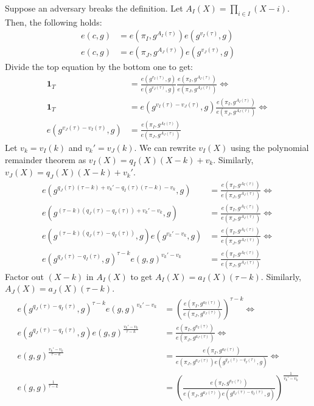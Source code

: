 Suppose an adversary breaks the definition.
Let $A_I(X)= \prod_{i\in I} (X - i)$.
Then, the following holds:
\begin{align}
e(c,g) &= e(\pi_I, g^{A_I(\tau)}) e(g^{v_I(\tau)},g)\\
e(c,g) &= e(\pi_J, g^{A_J(\tau)}) e(g^{v_J(\tau)},g)
\end{align}
Divide the top equation by the bottom one to get:
\begin{align}
\mathbf{1}_T &= \frac{e(g^{v_I(\tau)},g)}{e(g^{v_J(\tau)},g)} \frac{e(\pi_I, g^{A_I(\tau)})}{e(\pi_J, g^{A_J(\tau)})}\Leftrightarrow\\
\mathbf{1}_T &= e(g^{v_I(\tau)-v_J(\tau)},g) \frac{e(\pi_I, g^{A_I(\tau)})}{e(\pi_J, g^{A_J(\tau)})}\Leftrightarrow\\
e(g^{v_J(\tau)-v_I(\tau)},g) &= \frac{e(\pi_I, g^{A_I(\tau)})}{e(\pi_J, g^{A_J(\tau)})}
\end{align}
Let $v_k = v_I(k)$ and $v_k' = v_J(k)$.
We can rewrite $v_I(X)$ using the polynomial remainder theorem as $v_I(X)=q_I(X)(X-k) + v_k$.
Similarly, $v_J(X)=q_J(X)(X-k) + v_k'$.
\begin{align}
e(g^{q_J(\tau)(\tau - k) + v_k'-q_I(\tau)(\tau -k)-v_k},g) &= \frac{e(\pi_I, g^{A_I(\tau)})}{e(\pi_J, g^{A_J(\tau)})}\Leftrightarrow\\
e(g^{(\tau - k)(q_J(\tau) -q_I(\tau)) + v_k'-v_k},g) &= \frac{e(\pi_I, g^{A_I(\tau)})}{e(\pi_J, g^{A_J(\tau)})}\Leftrightarrow\\
e(g^{(\tau - k)(q_J(\tau) -q_I(\tau))}, g) e(g^{v_k'-v_k},g) &= \frac{e(\pi_I, g^{A_I(\tau)})}{e(\pi_J, g^{A_J(\tau)})}\Leftrightarrow\\
e(g^{q_J(\tau) -q_I(\tau)}, g)^{\tau - k} e(g,g)^{v_k'-v_k} &= \frac{e(\pi_I, g^{A_I(\tau)})}{e(\pi_J, g^{A_J(\tau)})}
\end{align}
Factor out $(X-k)$ in $A_I(X)$ to get $A_I(X)=a_I(X)(\tau - k)$.
Similarly, $A_J(X)=a_J(X)(\tau - k)$.
\begin{align}
e(g^{q_J(\tau) -q_I(\tau)}, g)^{\tau - k} e(g,g)^{v_k'-v_k} &= \left(\frac{e(\pi_I, g^{a_I(\tau)})}{e(\pi_J, g^{a_J(\tau)})}\right)^{\tau -k}\Leftrightarrow\\
e(g^{q_J(\tau) -q_I(\tau)}, g) e(g,g)^\frac{v_k'-v_k}{\tau - k} &= \frac{e(\pi_I, g^{a_I(\tau)})}{e(\pi_J, g^{a_J(\tau)})}\Leftrightarrow\\
e(g,g)^\frac{v_k'-v_k}{\tau - k} &= \frac{e(\pi_I, g^{a_I(\tau)})}{e(\pi_J, g^{a_J(\tau)}) e(g^{q_J(\tau) - q_I(\tau)}, g)}\Leftrightarrow\\
e(g,g)^\frac{1}{\tau - k} &= \left(\frac{e(\pi_I, g^{a_I(\tau)})}{e(\pi_J, g^{a_J(\tau)}) e(g^{q_J(\tau) - q_I(\tau)}, g)}\right)^{\frac{1}{v_k'-v_k}}
\end{align}


